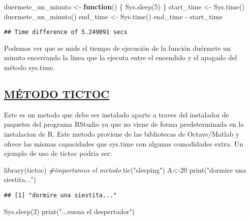 \documentclass[preprint, 3p,
authoryear]{elsarticle} %
\newenvironment{Shaded}{\begin{snugshade}}{\end{snugshade}}
\newcommand{\CommentTok}[1]{\textcolor[rgb]{0.56,0.35,0.01}{\textit{#1}}}
\newcommand{\ControlFlowTok}[1]{\textcolor[rgb]{0.13,0.29,0.53}{\textbf{#1}}}
\newcommand{\DecValTok}[1]{\textcolor[rgb]{0.00,0.00,0.81}{#1}}
\newcommand{\FunctionTok}[1]{\textcolor[rgb]{0.00,0.00,0.00}{#1}}
\newcommand{\NormalTok}[1]{#1}
\newcommand{\OtherTok}[1]{\textcolor[rgb]{0.56,0.35,0.01}{#1}}
\newcommand{\SpecialCharTok}[1]{\textcolor[rgb]{0.00,0.00,0.00}{#1}}
\newcommand{\StringTok}[1]{\textcolor[rgb]{0.31,0.60,0.02}{#1}}
\begin{document}
\begin{Shaded}
\begin{Highlighting}[]
\NormalTok{duermete\_un\_minuto }\OtherTok{\textless{}{-}} \ControlFlowTok{function}\NormalTok{() \{ }\FunctionTok{Sys.sleep}\NormalTok{(}\DecValTok{5}\NormalTok{) \}}
\NormalTok{start\_time }\OtherTok{\textless{}{-}} \FunctionTok{Sys.time}\NormalTok{()}
\FunctionTok{duermete\_un\_minuto}\NormalTok{()}
\NormalTok{end\_time }\OtherTok{\textless{}{-}} \FunctionTok{Sys.time}\NormalTok{()}
\NormalTok{end\_time }\SpecialCharTok{{-}}\NormalTok{ start\_time}
\end{Highlighting}
\end{Shaded}

\begin{verbatim}
## Time difference of 5.249091 secs
\end{verbatim}

Podemos ver que se mide el tiempo de ejecución de la función duérmete un
minuto encerrando la linea que la ejecuta entre el encendido y el
apagado del método sys.time.

\hypertarget{muxe9todo-tictoc}{%
\subsection{\texorpdfstring{\uline{\textbf{MÉTODO
TICTOC}}}{MÉTODO TICTOC}}\label{muxe9todo-tictoc}}

Este es un metodo que debe ser instalado aparte a traves del instalador
de paquetes del programa RStudio ya que no viene de forma predeterminada
en la instalacion de R. Este metodo proviene de las bibliotecas de
Octave/Matlab y ofrece las mismas capacidades que sys.time con algunas
comodidades extra. Un ejemplo de uso de tictoc podria ser:

\begin{Shaded}
\begin{Highlighting}[]
\FunctionTok{library}\NormalTok{(tictoc) }\CommentTok{\#importamos el metodo}
\FunctionTok{tic}\NormalTok{(}\StringTok{"sleeping"}\NormalTok{)}
\NormalTok{A}\OtherTok{\textless{}{-}}\DecValTok{20}
\FunctionTok{print}\NormalTok{(}\StringTok{"dormire una siestita..."}\NormalTok{)}
\end{Highlighting}
\end{Shaded}

\begin{verbatim}
## [1] "dormire una siestita..."
\end{verbatim}

\begin{Shaded}
\begin{Highlighting}[]
\FunctionTok{Sys.sleep}\NormalTok{(}\DecValTok{2}\NormalTok{)}
\FunctionTok{print}\NormalTok{(}\StringTok{"...suena el despertador"}\NormalTok{)}
\end{Highlighting}
\end{Shaded}
\end{document}
